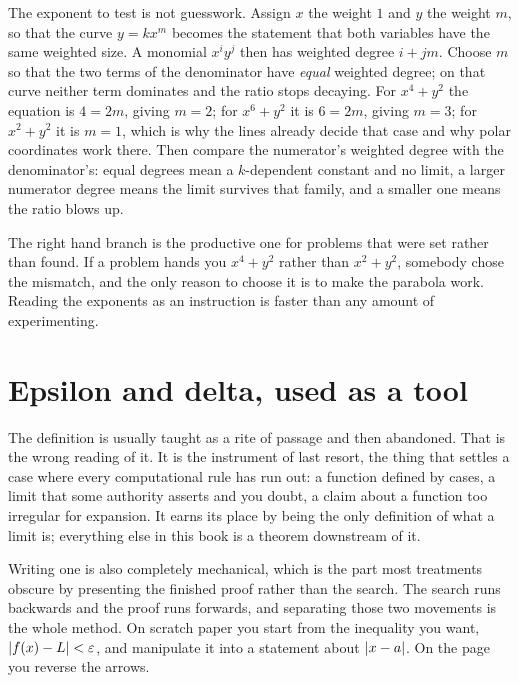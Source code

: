 \begin{keynote}
The exponent to test is not guesswork. Assign $x$ the weight $1$ and $y$ the weight $m$, so that the curve $y=kx^{m}$ becomes the statement that both variables have the same weighted size. A monomial $x^{i}y^{j}$ then has weighted degree $i+jm$. Choose $m$ so that the two terms of the denominator have \emph{equal} weighted degree; on that curve neither term dominates and the ratio stops decaying. For $x^{4}+y^{2}$ the equation is $4=2m$, giving $m=2$; for $x^{6}+y^{2}$ it is $6=2m$, giving $m=3$; for $x^{2}+y^{2}$ it is $m=1$, which is why the lines already decide that case and why polar coordinates work there. Then compare the numerator's weighted degree with the denominator's: equal degrees mean a $k$-dependent constant and no limit, a larger numerator degree means the limit survives that family, and a smaller one means the ratio blows up.
\end{keynote}

The right hand branch is the productive one for problems that were set rather than found. If a problem hands you $x^{4}+y^{2}$ rather than $x^{2}+y^{2}$, somebody chose the mismatch, and the only reason to choose it is to make the parabola work. Reading the exponents as an instruction is faster than any amount of experimenting.

\section{Epsilon and delta, used as a tool}

The definition is usually taught as a rite of passage and then abandoned. That is the wrong reading of it. It is the instrument of last resort, the thing that settles a case where every computational rule has run out: a function defined by cases, a limit that some authority asserts and you doubt, a claim about a function too irregular for expansion. It earns its place by being the only definition of what a limit is; everything else in this book is a theorem downstream of it.

Writing one is also completely mechanical, which is the part most treatments obscure by presenting the finished proof rather than the search. The search runs backwards and the proof runs forwards, and separating those two movements is the whole method. On scratch paper you start from the inequality you want, $\left\lvert f(x)-L\right\rvert<\varepsilon$, and manipulate it into a statement about $\left\lvert x-a\right\rvert$. On the page you reverse the arrows.

